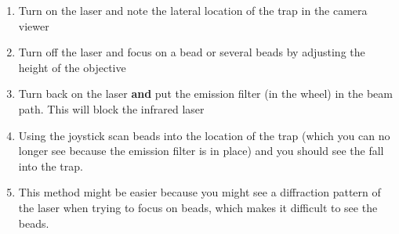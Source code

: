 \documentclass{../lab}
\begin{document}
\begin{enumerate}
    \item Turn on the laser and note the lateral location of the trap in the camera viewer

    \item Turn off the laser and focus on a bead or several beads by adjusting the height of the objective

    \item Turn back on the laser \textbf{and} put the emission filter (in the wheel) in the beam path. This will block the infrared laser

    \item Using the joystick scan beads into the location of the trap (which you can no longer see because the emission filter is in place) and you should see the fall into the trap.

    \item This method might be easier because you might see a diffraction pattern of the laser when trying to focus on beads, which makes it difficult to see the beads.
\end{enumerate}








\end{document}
